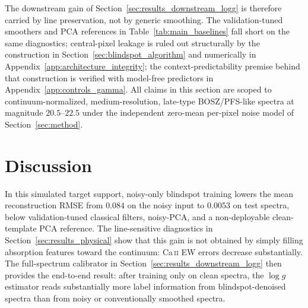 \documentclass[twocolumn]{aastex7}
\newcounter{algorithm}
\begin{document}
The downstream gain of Section~\ref{sec:results_downstream_logg} is therefore carried by line preservation, not by generic smoothing. The validation-tuned smoothers and PCA references in Table~\ref{tab:main_baselines} fall short on the same diagnostics; central-pixel leakage is ruled out structurally by the construction in Section~\ref{sec:blindspot_algorithm} and numerically in Appendix~\ref{app:architecture_integrity}; the context-predictability premise behind that construction is verified with model-free predictors in Appendix~\ref{app:controls_gamma}. All claims in this section are scoped to continuum-normalized, medium-resolution, late-type BOSZ/PFS-like spectra at magnitude $20.5$--$22.5$ under the independent zero-mean per-pixel noise model of Section~\ref{sec:method}.

\section{Discussion}
\label{sec:discussion}
In this simulated target support, noisy-only blindspot training lowers the mean reconstruction RMSE from $0.084$ on the noisy input to $0.0053$ on test spectra, below validation-tuned classical filters, noisy-PCA, and a non-deployable clean-template PCA reference. The line-sensitive diagnostics in Section~\ref{sec:results_physical} show that this gain is not obtained by simply filling absorption features toward the continuum: Ca\,\textsc{ii} EW errors decrease substantially. The full-spectrum calibrator in Section~\ref{sec:results_downstream_logg} then provides the end-to-end result: after training only on clean spectra, the $\log g$ estimator reads substantially more label information from blindspot-denoised spectra than from noisy or conventionally smoothed spectra.
\end{document}
